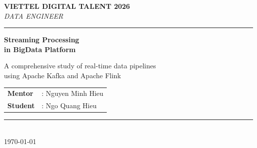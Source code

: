\documentclass[12pt, a4paper]{report}
\begin{document}
\begin{titlepage}
  \centering
  \vspace*{1.5cm}

  {\Large\bfseries VIETTEL DIGITAL TALENT 2026}\\[0.4cm]
  {\large\itshape DATA ENGINEER}\\[0.3cm]
  \noindent\rule{\textwidth}{0.8pt}

  \vspace{2.5cm}

  {\fontsize{22}{28}\selectfont\bfseries
    Streaming Processing\\[0.25cm]
    in BigData Platform}

  \vspace{1cm}

  {\large\color{gray} A comprehensive study of real-time data pipelines\\
  using Apache Kafka and Apache Flink}

  \vspace{3.5cm}

  \begin{tabular}{@{}ll@{}}
    \textbf{Mentor}  & : Nguyen Minh Hieu \\[0.6cm]
    \textbf{Student} & : Ngo Quang Hieu   \\
  \end{tabular}

  \vfill

  \noindent\rule{\textwidth}{0.4pt}\\[0.3cm]
  {\large\today}
\end{titlepage}


\tableofcontents
\clearpage

{}
\listoffigures
\clearpage

{}
\listoftables
\clearpage
\end{document}

